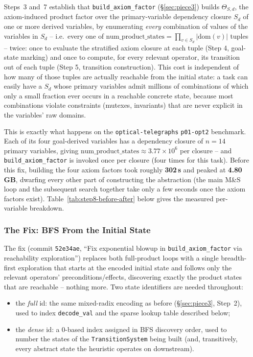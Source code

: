 \documentclass[11pt,a4paper]{article}
\begin{document}
Steps~3 and~7 establish that \texttt{build\_axiom\_factor}
(\S\ref{sec:piece3}) builds $\Theta_{S,d}$, the axiom-induced product factor
over the primary-variable dependency closure $S_d$ of one or more derived
variables, by enumerating \emph{every} combination of values of the
variables in $S_d$ -- i.e.\ every one of
$\mathrm{num\_product\_states} = \prod_{v \in S_d} |\mathrm{dom}(v)|$ tuples
-- twice: once to evaluate the stratified axiom closure at each tuple (Step
4, goal-state marking) and once to compute, for every relevant operator,
its transition out of each tuple (Step 5, transition construction). This
cost is independent of how many of those tuples are actually reachable from
the initial state: a task can easily have a $S_d$ whose primary variables
admit millions of combinations of which only a small fraction ever occurs
in a reachable concrete state, because most combinations violate
constraints (mutexes, invariants) that are never explicit in the variables'
raw domains.

This is exactly what happens on the \texttt{optical-telegraphs}
\texttt{p01-opt2} benchmark. Each of its four goal-derived variables has a
dependency closure of $n = 14$ primary variables, giving
$\mathrm{num\_product\_states} \approx 3.77 \times 10^6$ per closure -- and
\texttt{build\_axiom\_factor} is invoked once per closure (four times for
this task). Before this fix, building the four axiom factors took roughly
\textbf{302\,s} and peaked at \textbf{4.80\,GB}, dwarfing every other part
of constructing the abstraction (the main M\&S loop and the subsequent
search together take only a few seconds once the axiom factors exist).
Table~\ref{tab:step8-before-after} below gives the measured per-variable
breakdown.

\subsubsection{The Fix: BFS From the Initial State}

The fix (commit \texttt{52e34ae}, ``Fix exponential blowup in
\texttt{build\_axiom\_factor} via reachability exploration'') replaces both
full-product loops with a single breadth-first exploration that starts at
the encoded initial state and follows only the relevant operators'
preconditions/effects, discovering exactly the product states that are
reachable -- nothing more. Two state identifiers are needed throughout:

\begin{itemize}
  \item the \emph{full} id: the same mixed-radix encoding as before
        (\S\ref{sec:piece3}, Step~2), used to index \texttt{decode\_val} and
        the sparse lookup table described below;
  \item the \emph{dense} id: a 0-based index assigned in BFS discovery
        order, used to number the states of the \texttt{TransitionSystem}
        being built (and, transitively, every abstract state the heuristic
        operates on downstream).
\end{itemize}
\end{document}
